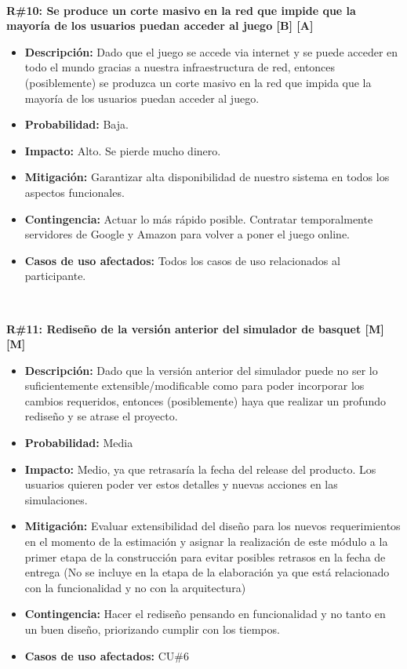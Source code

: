 ~

\noindent\textbf{R\#10: Se produce un corte masivo en la red que impide que la mayoría de los usuarios puedan acceder al juego [B] [A] } 
\begin{itemize}
	\item{\textbf{Descripción:} Dado que el juego se accede via internet y se puede acceder en todo el mundo gracias a nuestra infraestructura de red, entonces (posiblemente) se produzca un corte masivo en la red que impida que la mayoría de los usuarios puedan acceder al juego.}
	\item{\textbf{Probabilidad:} Baja.}
	\item{\textbf{Impacto:} Alto. Se pierde mucho dinero.}
	\item{\textbf{Mitigación:} Garantizar alta disponibilidad de nuestro sistema en todos los aspectos funcionales.}
	\item{\textbf{Contingencia:} Actuar lo más rápido posible. Contratar temporalmente servidores de Google y Amazon para volver a poner el juego online.}
	\item{\textbf{Casos de uso afectados:} Todos los casos de uso relacionados al participante.}
\end{itemize}

~

\noindent\textbf{R\#11: Rediseño de la versión anterior del simulador de basquet [M] [M]}
\begin{itemize}
	\item{\textbf{Descripción:} Dado que la versión anterior del simulador puede no ser lo suficientemente extensible/modificable como para poder incorporar los cambios requeridos, entonces (posiblemente) haya que realizar un profundo rediseño y se atrase el proyecto.}
	\item{\textbf{Probabilidad:} Media}
	\item{\textbf{Impacto:} Medio, ya que retrasaría la fecha del release del producto. Los usuarios quieren poder ver estos detalles y nuevas acciones en las simulaciones.}
	\item{\textbf{Mitigación:} Evaluar extensibilidad del diseño para los nuevos requerimientos en el momento de la estimación y asignar la realización de este módulo a la primer etapa de la construcción para evitar posibles retrasos en la fecha de entrega (No se incluye en la etapa de la elaboración ya que está relacionado con la funcionalidad y no con la arquitectura)}
	\item{\textbf{Contingencia:} Hacer el rediseño pensando en funcionalidad y no tanto en un buen diseño, priorizando cumplir con los tiempos.}
	\item{\textbf{Casos de uso afectados:} CU\#6}
\end{itemize}

